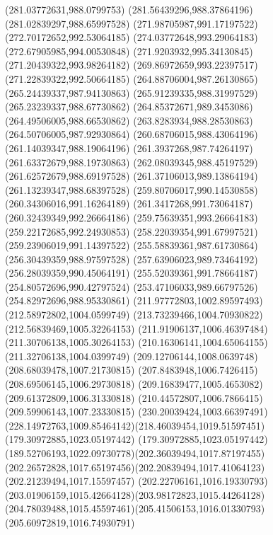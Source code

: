 {{\lineto(281.03772631,988.0799753)
\lineto(281.56439296,988.37864196)
\lineto(281.02839297,988.65997528)
\closepath
\moveto(271.98705987,991.17197522)
\lineto(272.70172652,992.53064185)
\lineto(274.03772648,993.29064183)
\lineto(272.67905985,994.00530848)
\lineto(271.9203932,995.34130845)
\lineto(271.20439322,993.98264182)
\lineto(269.86972659,993.22397517)
\lineto(271.22839322,992.50664185)
\closepath
\moveto(264.88706004,987.26130865)
\lineto(265.24439337,987.94130863)
\lineto(265.91239335,988.31997529)
\lineto(265.23239337,988.67730862)
\lineto(264.85372671,989.3453086)
\lineto(264.49506005,988.66530862)
\lineto(263.8283934,988.28530863)
\lineto(264.50706005,987.92930864)
\closepath
\moveto(260.68706015,988.43064196)
\lineto(261.14039347,988.19064196)
\lineto(261.3937268,987.74264197)
\lineto(261.63372679,988.19730863)
\lineto(262.08039345,988.45197529)
\lineto(261.62572679,988.69197528)
\lineto(261.37106013,989.13864194)
\lineto(261.13239347,988.68397528)
\closepath
\moveto(259.80706017,990.14530858)
\lineto(260.34306016,991.16264189)
\lineto(261.3417268,991.73064187)
\lineto(260.32439349,992.26664186)
\lineto(259.75639351,993.26664183)
\lineto(259.22172685,992.24930853)
\lineto(258.22039354,991.67997521)
\lineto(259.23906019,991.14397522)
\closepath
\moveto(255.58839361,987.61730864)
\lineto(256.30439359,988.97597528)
\lineto(257.63906023,989.73464192)
\lineto(256.28039359,990.45064191)
\lineto(255.52039361,991.78664187)
\lineto(254.80572696,990.42797524)
\lineto(253.47106033,989.66797526)
\lineto(254.82972696,988.95330861)
\closepath
\moveto(211.97772803,1002.89597493)
\lineto(212.58972802,1004.0599749)
\lineto(213.73239466,1004.70930822)
\lineto(212.56839469,1005.32264153)
\lineto(211.91906137,1006.46397484)
\lineto(211.30706138,1005.30264153)
\lineto(210.16306141,1004.65064155)
\lineto(211.32706138,1004.0399749)
\closepath
\moveto(209.12706144,1008.0639748)
\lineto(208.68039478,1007.21730815)
\lineto(207.8483948,1006.7426415)
\lineto(208.69506145,1006.29730818)
\lineto(209.16839477,1005.4653082)
\lineto(209.61372809,1006.31330818)
\lineto(210.44572807,1006.7866415)
\lineto(209.59906143,1007.23330815)
\closepath
\moveto(230.20039424,1003.66397491)
\curveto(228.14972763,1009.85464142)(218.46039454,1019.51597451)(179.30972885,1023.05197442)
\curveto(179.30972885,1023.05197442)(189.52706193,1022.09730778)(202.36039494,1017.87197455)
\curveto(202.26572828,1017.65197456)(202.20839494,1017.41064123)(202.21239494,1017.15597457)
\curveto(202.22706161,1016.19330793)(203.01906159,1015.42664128)(203.98172823,1015.44264128)
\curveto(204.78039488,1015.45597461)(205.41506153,1016.01330793)(205.60972819,1016.74930791)
}}

